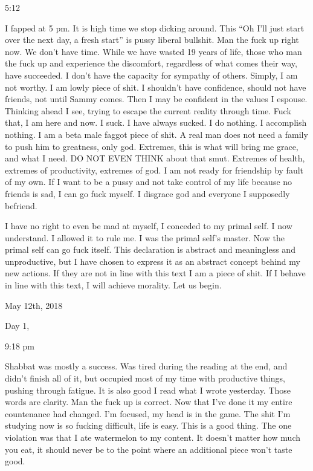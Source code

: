 5:12

I fapped at 5 pm. It is high time we stop dicking around. This ``Oh I'll
just start over the next day, a fresh start'' is pussy liberal bullshit.
Man the fuck up right now. We don't have time. While we have wasted 19
years of life, those who man the fuck up and experience the discomfort,
regardless of what comes their way, have succeeded. I don't have the
capacity for sympathy of others. Simply, I am not worthy. I am lowly
piece of shit. I shouldn't have confidence, should not have friends, not
until Sammy comes. Then I may be confident in the values I espouse.
Thinking ahead I see, trying to escape the current reality through time.
Fuck that, I am here and now. I suck. I have always sucked. I do
nothing. I accomplish nothing. I am a beta male faggot piece of shit. A
real man does not need a family to push him to greatness, only god.
Extremes, this is what will bring me grace, and what I need. DO NOT EVEN
THINK about that smut. Extremes of health, extremes of productivity,
extremes of god. I am not ready for friendship by fault of my own. If I
want to be a pussy and not take control of my life because no friends is
sad, I can go fuck myself. I disgrace god and everyone I supposedly
befriend.

I have no right to even be mad at myself, I conceded to my primal self.
I now understand. I allowed it to rule me. I was the primal self's
master. Now the primal self can go fuck itself. This declaration is
abstract and meaningless and unproductive, but I have chosen to express
it as an abstract concept behind my new actions. If they are not in line
with this text I am a piece of shit. If I behave in line with this text,
I will achieve morality. Let us begin.

\bigskip
\bigskip
May 12th, 2018

Day 1,

9:18 pm

Shabbat was mostly a success. Was tired during the reading at the end,
and didn't finish all of it, but occupied most of my time with
productive things, pushing through fatigue. It is also good I read what
I wrote yesterday. Those words are clarity. Man the fuck up is correct.
Now that I've done it my entire countenance had changed. I'm focused, my
head is in the game. The shit I'm studying now is so fucking difficult,
life is easy. This is a good thing. The one violation was that I ate
watermelon to my content. It doesn't matter how much you eat, it should
never be to the point where an additional piece won't taste good.

